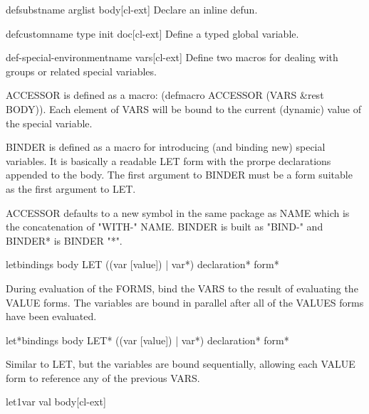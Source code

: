 \documentclass[10pt,english]{book}
\begin{document}
\begin{macro}{defsubst}{name arglist \body body}[cl-ext]
  Declare an inline defun.
\end{macro}

\begin{macro}{defcustom}{name type init doc}[cl-ext]
  Define a typed global variable.
\end{macro}

\begin{macro}{def-special-environment}{name \key \rest vars}[cl-ext]
  Define two macros for dealing with groups or related special variables.

ACCESSOR is defined as a macro: (defmacro ACCESSOR (VARS \&rest
BODY)).  Each element of VARS will be bound to the
current (dynamic) value of the special variable.

BINDER is defined as a macro for introducing (and binding new)
special variables. It is basically a readable LET form with the
prorpe declarations appended to the body. The first argument to
BINDER must be a form suitable as the first argument to LET.

ACCESSOR defaults to a new symbol in the same package as NAME
which is the concatenation of "WITH-" NAME. BINDER is built as
"BIND-" and BINDER* is BINDER "*".
\end{macro}

\begin{specialop}{let}{bindings \body body}
  LET ({(var [value]) | var}*) declaration* form*

During evaluation of the FORMS, bind the VARS to the result of evaluating the
VALUE forms. The variables are bound in parallel after all of the VALUES forms
have been evaluated.
\end{specialop}

\begin{specialop}{let*}{bindings \body body}
  LET* ({(var [value]) | var}*) declaration* form*

Similar to LET, but the variables are bound sequentially, allowing each VALUE
form to reference any of the previous VARS.
\end{specialop}

\begin{macro}{let1}{var val \body body}[cl-ext]
  
\end{macro}
\end{document}
